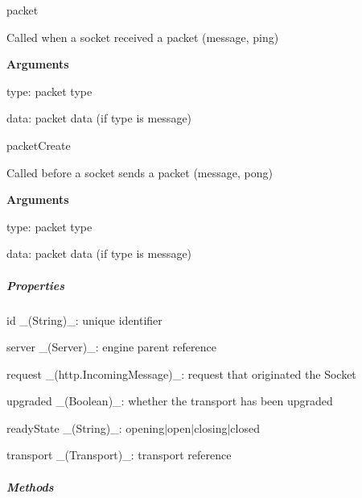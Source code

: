 \begin{DoxyItemize}
\item {\ttfamily packet}
\begin{DoxyItemize}
\item Called when a socket received a packet ({\ttfamily message}, {\ttfamily ping})
\item {\bfseries Arguments}
\begin{DoxyItemize}
\item {\ttfamily type}\+: packet type
\item {\ttfamily data}\+: packet data (if type is message)
\end{DoxyItemize}
\end{DoxyItemize}
\item {\ttfamily packet\+Create}
\begin{DoxyItemize}
\item Called before a socket sends a packet ({\ttfamily message}, {\ttfamily pong})
\item {\bfseries Arguments}
\begin{DoxyItemize}
\item {\ttfamily type}\+: packet type
\item {\ttfamily data}\+: packet data (if type is message)
\end{DoxyItemize}
\end{DoxyItemize}
\end{DoxyItemize}

\subparagraph*{Properties}


\begin{DoxyItemize}
\item {\ttfamily id} \+\_\+(\+String)\+\_\+\+: unique identifier
\item {\ttfamily server} \+\_\+(\+Server)\+\_\+\+: engine parent reference
\item {\ttfamily request} \+\_\+(http.\+Incoming\+Message)\+\_\+\+: request that originated the Socket
\item {\ttfamily upgraded} \+\_\+(\+Boolean)\+\_\+\+: whether the transport has been upgraded
\item {\ttfamily ready\+State} \+\_\+(\+String)\+\_\+\+: opening$\vert$open$\vert$closing$\vert$closed
\item {\ttfamily transport} \+\_\+(\+Transport)\+\_\+\+: transport reference
\end{DoxyItemize}

\subparagraph*{Methods}


